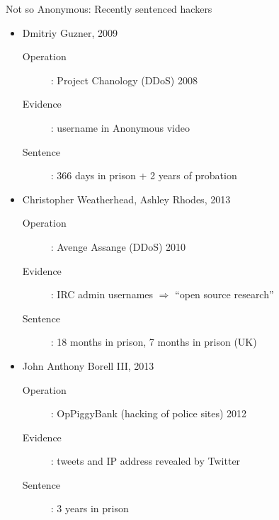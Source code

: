 \documentclass{beamer}
\begin{document}
\begin{frame}{Not so Anonymous: Recently sentenced hackers}
\begin{itemize}
\item Dmitriy Guzner, 2009
\begin{description}
\item[Operation]: Project Chanology (DDoS) 2008
\item[Evidence]: username in Anonymous video
\item[Sentence]: 366 days in prison + 2 years of probation
\end{description}
\item Christopher Weatherhead, Ashley Rhodes, 2013
\begin{description}
\item[Operation]: Avenge Assange (DDoS) 2010
\item[Evidence]: IRC admin usernames $\Rightarrow$ ``open source research''
\item[Sentence]: 18 months in prison, 7 months in prison (UK)
\end{description}
\item John Anthony Borell III, 2013
\begin{description}
\item[Operation]: OpPiggyBank (hacking of police sites) 2012
\item[Evidence]: tweets and IP address revealed by Twitter
\item[Sentence]: 3 years in prison
\end{description}
\end{itemize}
\end{frame}
\end{document}
